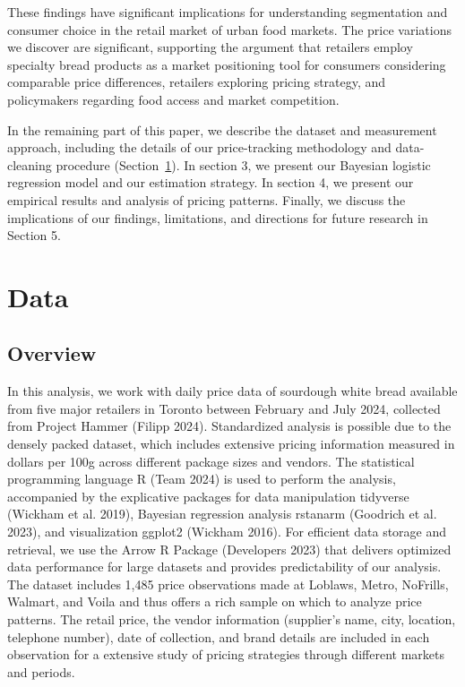 \documentclass[
  letterpaper,
  DIV=11,
  numbers=noendperiod]{scrartcl}
\begin{document}
These findings have significant implications for understanding
segmentation and consumer choice in the retail market of urban food
markets. The price variations we discover are significant, supporting
the argument that retailers employ specialty bread products as a market
positioning tool for consumers considering comparable price differences,
retailers exploring pricing strategy, and policymakers regarding food
access and market competition.

In the remaining part of this paper, we describe the dataset and
measurement approach, including the details of our price-tracking
methodology and data-cleaning procedure (Section~\ref{sec-data}). In
section 3, we present our Bayesian logistic regression model and our
estimation strategy. In section 4, we present our empirical results and
analysis of pricing patterns. Finally, we discuss the implications of
our findings, limitations, and directions for future research in Section
5.

\section{Data}\label{sec-data}

\subsection{Overview}\label{overview}

In this analysis, we work with daily price data of sourdough white bread
available from five major retailers in Toronto between February and July
2024, collected from Project Hammer (Filipp 2024). Standardized analysis
is possible due to the densely packed dataset, which includes extensive
pricing information measured in dollars per 100g across different
package sizes and vendors. The statistical programming language R (Team
2024) is used to perform the analysis, accompanied by the explicative
packages for data manipulation tidyverse (Wickham et al. 2019), Bayesian
regression analysis rstanarm (Goodrich et al. 2023), and visualization
ggplot2 (Wickham 2016). For efficient data storage and retrieval, we use
the Arrow R Package (Developers 2023) that delivers optimized data
performance for large datasets and provides predictability of our
analysis. The dataset includes 1,485 price observations made at Loblaws,
Metro, NoFrills, Walmart, and Voila and thus offers a rich sample on
which to analyze price patterns. The retail price, the vendor
information (supplier's name, city, location, telephone number), date of
collection, and brand details are included in each observation for a
extensive study of pricing strategies through different markets and
periods.
\end{document}
